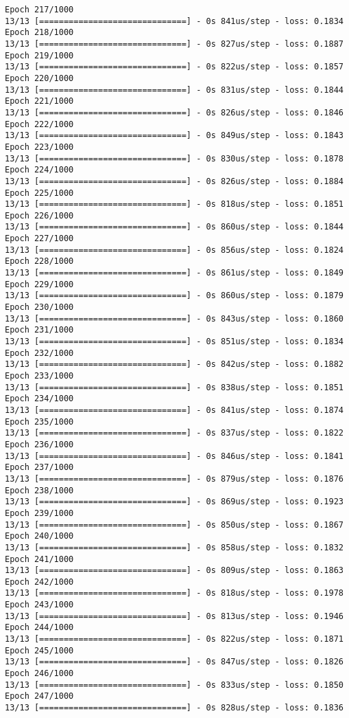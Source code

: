 \documentclass[11pt]{article}
\begin{document}
\begin{Verbatim}[commandchars=\\\{\}]
Epoch 217/1000
13/13 [==============================] - 0s 841us/step - loss: 0.1834
Epoch 218/1000
13/13 [==============================] - 0s 827us/step - loss: 0.1887
Epoch 219/1000
13/13 [==============================] - 0s 822us/step - loss: 0.1857
Epoch 220/1000
13/13 [==============================] - 0s 831us/step - loss: 0.1844
Epoch 221/1000
13/13 [==============================] - 0s 826us/step - loss: 0.1846
Epoch 222/1000
13/13 [==============================] - 0s 849us/step - loss: 0.1843
Epoch 223/1000
13/13 [==============================] - 0s 830us/step - loss: 0.1878
Epoch 224/1000
13/13 [==============================] - 0s 826us/step - loss: 0.1884
Epoch 225/1000
13/13 [==============================] - 0s 818us/step - loss: 0.1851
Epoch 226/1000
13/13 [==============================] - 0s 860us/step - loss: 0.1844
Epoch 227/1000
13/13 [==============================] - 0s 856us/step - loss: 0.1824
Epoch 228/1000
13/13 [==============================] - 0s 861us/step - loss: 0.1849
Epoch 229/1000
13/13 [==============================] - 0s 860us/step - loss: 0.1879
Epoch 230/1000
13/13 [==============================] - 0s 843us/step - loss: 0.1860
Epoch 231/1000
13/13 [==============================] - 0s 851us/step - loss: 0.1834
Epoch 232/1000
13/13 [==============================] - 0s 842us/step - loss: 0.1882
Epoch 233/1000
13/13 [==============================] - 0s 838us/step - loss: 0.1851
Epoch 234/1000
13/13 [==============================] - 0s 841us/step - loss: 0.1874
Epoch 235/1000
13/13 [==============================] - 0s 837us/step - loss: 0.1822
Epoch 236/1000
13/13 [==============================] - 0s 846us/step - loss: 0.1841
Epoch 237/1000
13/13 [==============================] - 0s 879us/step - loss: 0.1876
Epoch 238/1000
13/13 [==============================] - 0s 869us/step - loss: 0.1923
Epoch 239/1000
13/13 [==============================] - 0s 850us/step - loss: 0.1867
Epoch 240/1000
13/13 [==============================] - 0s 858us/step - loss: 0.1832
Epoch 241/1000
13/13 [==============================] - 0s 809us/step - loss: 0.1863
Epoch 242/1000
13/13 [==============================] - 0s 818us/step - loss: 0.1978
Epoch 243/1000
13/13 [==============================] - 0s 813us/step - loss: 0.1946
Epoch 244/1000
13/13 [==============================] - 0s 822us/step - loss: 0.1871
Epoch 245/1000
13/13 [==============================] - 0s 847us/step - loss: 0.1826
Epoch 246/1000
13/13 [==============================] - 0s 833us/step - loss: 0.1850
Epoch 247/1000
13/13 [==============================] - 0s 828us/step - loss: 0.1836

\end{Verbatim}
\end{document}
